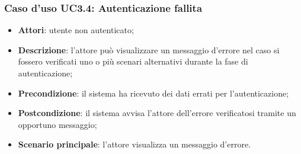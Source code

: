 \subsubsection{Caso d'uso UC3.4: Autenticazione fallita}
\begin{itemize}
	\item \textbf{Attori}: utente non autenticato;
	\item \textbf{Descrizione}: l'attore può visualizzare un messaggio d'errore nel caso si fossero verificati uno o più scenari alternativi durante la fase di autenticazione;
	\item \textbf{Precondizione}: il sistema ha ricevuto dei dati errati per l'autenticazione;
	\item \textbf{Postcondizione}: il sistema avvisa l'attore dell'errore verificatosi tramite un opportuno messaggio;
	\item \textbf{Scenario principale}: l'attore visualizza un messaggio d'errore.
\end{itemize}
